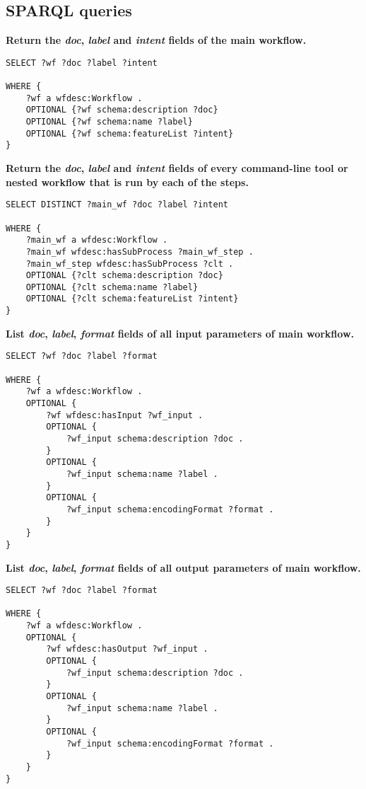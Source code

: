 \subsection{SPARQL queries}

\noindent
\textbf{Return the \emph{doc}, \emph{label} and \emph{intent} fields of the main workflow.}
\begin{verbatim}
SELECT ?wf ?doc ?label ?intent

WHERE {
    ?wf a wfdesc:Workflow .
    OPTIONAL {?wf schema:description ?doc}
    OPTIONAL {?wf schema:name ?label}
    OPTIONAL {?wf schema:featureList ?intent}
}
\end{verbatim}

\noindent
\textbf{Return the \emph{doc}, \emph{label} and \emph{intent} fields of every command-line tool or nested workflow that is run by each of the steps.}

\begin{verbatim}
SELECT DISTINCT ?main_wf ?doc ?label ?intent

WHERE {
    ?main_wf a wfdesc:Workflow .
    ?main_wf wfdesc:hasSubProcess ?main_wf_step .
    ?main_wf_step wfdesc:hasSubProcess ?clt .
    OPTIONAL {?clt schema:description ?doc}
    OPTIONAL {?clt schema:name ?label}
    OPTIONAL {?clt schema:featureList ?intent}
}
\end{verbatim}
\noindent
\textbf{List \emph{doc}, \emph{label}, \emph{format} fields of all input parameters of main workflow.}

\begin{verbatim}
SELECT ?wf ?doc ?label ?format

WHERE {
    ?wf a wfdesc:Workflow .
    OPTIONAL {
        ?wf wfdesc:hasInput ?wf_input .
        OPTIONAL {
            ?wf_input schema:description ?doc .
        }
        OPTIONAL {
            ?wf_input schema:name ?label .
        }
        OPTIONAL {
            ?wf_input schema:encodingFormat ?format .
        }
    }
}
\end{verbatim}

\noindent
\textbf{List \emph{doc}, \emph{label}, \emph{format} fields of all output parameters of main workflow.}

\begin{verbatim}
SELECT ?wf ?doc ?label ?format

WHERE {
    ?wf a wfdesc:Workflow .
    OPTIONAL {
        ?wf wfdesc:hasOutput ?wf_input .
        OPTIONAL {
            ?wf_input schema:description ?doc .
        }
        OPTIONAL {
            ?wf_input schema:name ?label .
        }
        OPTIONAL {
            ?wf_input schema:encodingFormat ?format .
        }
    }
}
\end{verbatim}


